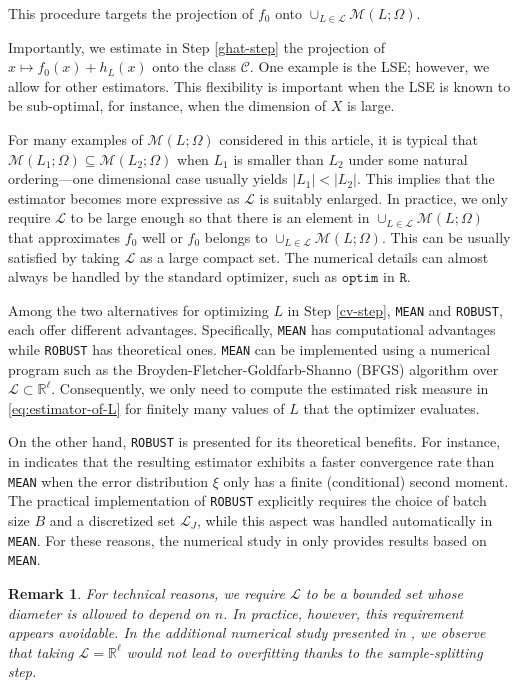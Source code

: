 \documentclass[12pt]{article}
\newtheorem{remark}{Remark}[section]
\begin{document}
This procedure targets the projection of $f_0$ onto $\cup_{L \in \mathcal{L}} \mathcal{M}(L; \Omega)$.

Importantly, we estimate in Step \ref{ghat-step} the projection of $x\mapsto f_0(x) + h_L(x)$ onto the class $\mathcal{C}$. One example is the LSE; however, we allow for other estimators. This flexibility is important when the LSE is known to be sub-optimal, for instance, when the dimension of $X$ is large.

For many examples of $\mathcal{M}(L; \Omega)$ considered in this article, it is typical that $\mathcal{M}(L_1; \Omega) \subseteq \mathcal{M}(L_2; \Omega)$ when $L_1$ is smaller than $L_2$ under some natural ordering---one dimensional case usually yields $|L_1| < |L_2|$.
This implies that the estimator becomes more expressive as $\mathcal{L}$ is suitably enlarged. In practice, we only require $\mathcal{L}$ to be large enough so that there is an element in $\cup_{L\in\mathcal{L}}\mathcal{M}(L; \Omega)$ that approximates $f_0$ well or $f_0$ belongs to $\cup_{L\in\mathcal{L}}\mathcal{M}(L; \Omega)$. This can be usually satisfied by taking $\mathcal{L}$ as a large compact set.  The numerical details can almost always be handled by the standard optimizer, such as $\texttt{optim}$ in $\texttt{R}$. 

Among the two alternatives for optimizing $L$ in Step \ref{cv-step}, \texttt{MEAN} and \texttt{ROBUST}, each offer different advantages. Specifically, \texttt{MEAN} has computational advantages while \texttt{ROBUST} has theoretical ones.
\texttt{MEAN} can be implemented using a numerical program such as the Broyden-Fletcher-Goldfarb-Shanno (BFGS) algorithm \citep{byrd1989tool} over $\mathcal{L}\subset\mathbb{R}^\ell$. Consequently, we only need to compute the estimated risk measure in \eqref{eq:estimator-of-L} for finitely many values of $L$ that the optimizer evaluates. 

On the other hand, \texttt{ROBUST} is presented for its theoretical benefits. For instance,  in  indicates that the resulting estimator exhibits a faster convergence rate than \texttt{MEAN} when the error distribution $\xi$ only has a finite (conditional) second moment. The practical implementation of \texttt{ROBUST} explicitly requires the choice of batch size $B$ and a discretized set $\mathcal{L}_J$, while this aspect was handled automatically in \texttt{MEAN}. For these reasons, the numerical study in  only provides results based on \texttt{MEAN}.
\begin{remark}
    For technical reasons, we require $\mathcal{L}$ to be a bounded set whose diameter is allowed to depend on $n$. In practice, however, this requirement appears avoidable. 
    In the additional numerical study presented in , we observe that taking $\mathcal{L} = \mathbb{R}^\ell$ would not lead to overfitting thanks to the sample-splitting step.
\end{remark}
\end{document}
